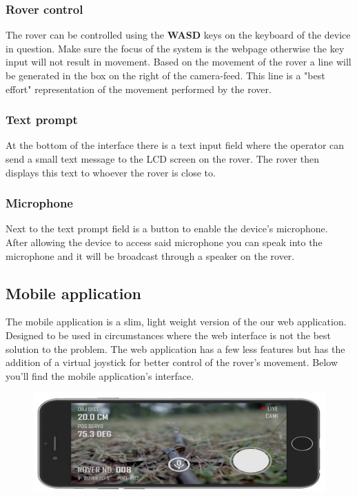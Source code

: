 \documentclass[12pt]{article}
\begin{document}
 	\subsubsection{Rover control}
 	The rover can be controlled using the \textbf{WASD} keys on the keyboard of the device in question. Make sure the focus of the system is the webpage otherwise the key input will not result in movement. Based on the movement of the rover a line will be generated in the box on the right of the camera-feed. This line is a "best effort" representation of the movement performed by the rover.
 	\subsubsection{Text prompt}
 	At the bottom of the interface there is a text input field where the operator can send a small text message to the LCD screen on the rover. The rover then displays this text to whoever the rover is close to.
 	\subsubsection{Microphone}
 	Next to the text prompt field is a button to enable the device's microphone. After allowing the device to access said microphone you can speak into the microphone and it will be broadcast through a speaker on the rover.
 	\subsection{Mobile application}
 	The mobile application is a slim, light weight version of the our web application. Designed to be used in circumstances where the web interface is not the best solution to the problem.
 	The web application has a few less features but has the addition of a virtual joystick for better control of the rover's movement. Below you'll find the mobile application's interface.
 	\begin{figure}[H]
 		\includegraphics[width=\columnwidth]{MobileApp.jpg}
 	\end{figure}
\end{document}
